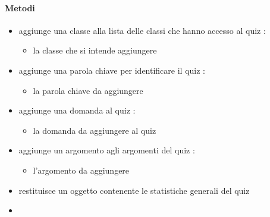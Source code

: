 \paragraph{Metodi}
\begin{itemize}
\item {}
\newline
aggiunge una classe alla lista delle classi che hanno accesso al quiz
\newline
{} :
\begin{itemize}
\item {}
\newline
la classe che si intende aggiungere
\end{itemize}
\item {}
\newline
aggiunge una parola chiave per identificare il quiz
\newline
{} :
\begin{itemize}
\item {}
\newline
la parola chiave da aggiungere
\end{itemize}
\item {}
\newline
aggiunge una domanda al quiz
\newline
{} :
\begin{itemize}
\item {}
\newline
la domanda da aggiungere al quiz
\end{itemize}
\item {}
\newline
aggiunge un argomento agli argomenti del quiz
\newline
{} :
\begin{itemize}
\item {}
\newline
l'argomento da aggiungere
\end{itemize}
\item {}
\newline
restituisce un oggetto contenente le statistiche generali del quiz
\newline
\item {}

\end{itemize}
